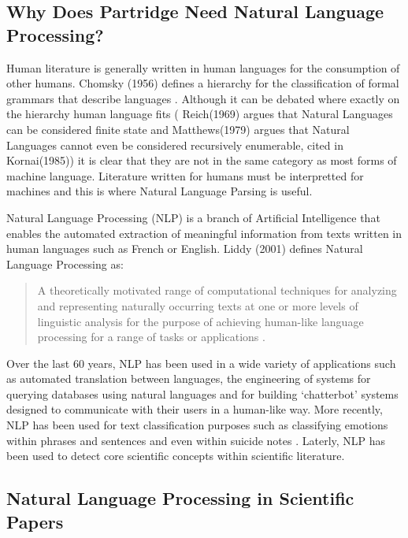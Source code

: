 \subsection{Why Does Partridge Need Natural Language Processing?}

Human literature is generally written in human languages for the consumption of
other humans. Chomsky (1956) defines a hierarchy for the classification of
formal grammars that describe languages \cite{chomsky1956three}. Although it
can be debated where exactly on the hierarchy human language fits (
Reich(1969)\cite{reich1969finiteness} argues that Natural Languages can be
considered finite state and Matthews(1979)\cite{matthews1979grammatical} argues
that Natural Languages cannot even be considered recursively enumerable, cited
in Kornai(1985)\cite{kornai1985}) it is clear that they are not in the same
category as most forms of machine language. Literature written for humans must
be interpretted for machines and this is where Natural Language Parsing is
useful.

Natural Language Processing (NLP)  is a branch of Artificial
Intelligence that enables the automated extraction of meaningful information
from texts written in human languages such as French or English. Liddy (2001)
defines Natural Language Processing as:

\begin{quotation} 
A theoretically motivated range of computational techniques for analyzing and
representing naturally occurring texts at one or more levels of linguistic
analysis for the purpose of achieving human-like language processing for a
range of tasks or applications \cite{liddy2001natural}.  
\end{quotation}

Over the last 60 years, NLP has been used in a wide variety of applications
such as automated translation between languages\cite{hutchins2004first}, the
engineering of systems for querying databases using natural languages
\cite{rao2010natural} and for building `chatterbot' systems designed to
communicate with their users in a human-like way\cite{Alfonsi2006}.
More recently, NLP has been used for text classification purposes such as
classifying emotions within phrases and sentences \cite{Wilson05Polarity} and
even within suicide notes \cite{citeulike:11077287}. Laterly, NLP has been
used to detect core scientific concepts within scientific literature.

\subsection{Natural Language Processing in Scientific Papers}

